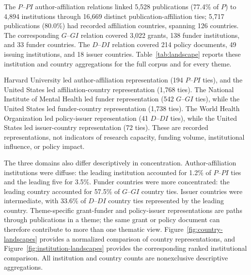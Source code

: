 \documentclass[12pt]{article}
\begin{document}
The $P$--$PI$ author-affiliation relations linked 5,528 publications (77.4\% of $P$) to 4,894 institutions through 16,669 distinct publication-affiliation ties; 5,717 publications (80.0\%) had recorded affiliation countries, spanning 126 countries. The corresponding $G$--$GI$ relation covered 3,022 grants, 138 funder institutions, and 33 funder countries. The $D$--$DI$ relation covered 214 policy documents, 49 issuing institutions, and 18 issuer countries. Table~\ref{tab:landscape} reports these institution and country aggregations for the full corpus and for every theme.

Harvard University led author-affiliation representation (194 $P$--$PI$ ties), and the United States led affiliation-country representation (1,768 ties). The National Institute of Mental Health led funder representation (542 $G$--$GI$ ties), while the United States led funder-country representation (1,738 ties). The World Health Organization led policy-issuer representation (41 $D$--$DI$ ties), while the United States led issuer-country representation (72 ties). These are recorded representations, not indicators of research capacity, funding volume, institutional influence, or policy impact.

The three domains also differ descriptively in concentration. Author-affiliation institutions were diffuse: the leading institution accounted for 1.2\% of $P$--$PI$ ties and the leading five for 3.5\%. Funder countries were more concentrated: the leading country accounted for 57.5\% of $G$--$GI$ country ties. Issuer countries were intermediate, with 33.6\% of $D$--$DI$ country ties represented by the leading country. Theme-specific grant-funder and policy-issuer representations are paths through publications in a theme; the same grant or policy document can therefore contribute to more than one thematic view. Figure~\ref{fig:country-landscapes} provides a normalized comparison of country representations, and Figure~\ref{fig:institution-landscapes} provides the corresponding ranked institutional comparison. All institution and country counts are nonexclusive descriptive aggregations.
\end{document}

